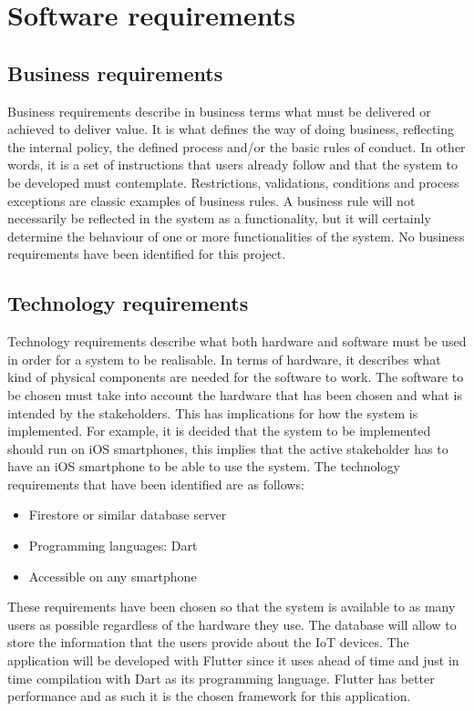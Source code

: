 \documentclass{scrreprt}
\begin{document}
\chapter{Software requirements}

\section{Business requirements}

Business requirements describe in business terms what must be delivered
or achieved to deliver value. It is what defines the way of doing business,
reflecting the internal policy, the defined process and/or the basic rules
of conduct.  In other words, it is a set of instructions that users already
follow and that the system to be developed must contemplate. Restrictions,
validations, conditions and process exceptions are classic examples of business
rules. A business rule will not necessarily be reflected in the system as
a functionality, but it will certainly determine the behaviour of one or
more functionalities of the system.
\newline
No business requirements have been identified for this project.

\section{Technology requirements}

Technology requirements describe what both hardware and software must be
used in order for a system to be realisable. In terms of hardware, it describes
what kind of physical components are needed for the software to work. The
software to be chosen must take into account the hardware that has been
chosen and what is intended by the stakeholders. This has implications for
how the system is implemented. For example, it is decided that the system
to be implemented should run on iOS smartphones, this implies that the active
stakeholder has to have an iOS smartphone to be able to use the system.
\newline
The technology requirements that have been identified are as follows:
\begin{itemize}
    \item Firestore or similar database server
    \item Programming languages: Dart
    \item Accessible on any smartphone
\end{itemize}
These requirements have been chosen so that the system is available to as
many users as possible regardless of the hardware they use. The database
will allow to store the information that the users provide about the IoT
devices. The application will be developed with Flutter since it uses ahead
of time and just in time compilation with Dart as its programming language.
Flutter has better performance and as such it is the chosen framework for
this application.
\end{document}
